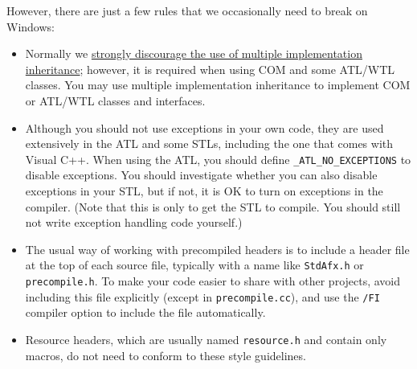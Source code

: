 However, there are just a few rules that we occasionally need to break on Windows:
\begin{itemize}
    \item Normally we \hyperref[sec:inheritance]{strongly discourage the use of multiple implementation inheritance}; however, it is required when using COM and some ATL/WTL classes. You may use multiple implementation inheritance to implement COM or ATL/WTL classes and interfaces.
    \item Although you should not use exceptions in your own code, they are used extensively in the ATL and some STLs, including the one that comes with Visual C++. When using the ATL, you should define \texttt{_ATL_NO_EXCEPTIONS} to disable exceptions. You should investigate whether you can also disable exceptions in your STL, but if not, it is OK to turn on exceptions in the compiler. (Note that this is only to get the STL to compile. You should still not write exception handling code yourself.)
    \item The usual way of working with precompiled headers is to include a header file at the top of each source file, typically with a name like \texttt{StdAfx.h} or \texttt{precompile.h}. To make your code easier to share with other projects, avoid including this file explicitly (except in \texttt{precompile.cc}), and use the \texttt{/FI} compiler option to include the file automatically.
    \item Resource headers, which are usually named \texttt{resource.h} and contain only macros, do not need to conform to these style guidelines.
\end{itemize}